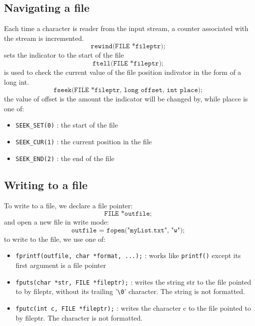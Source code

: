 \documentclass[a4paper, 10pt]{article}
\begin{document}
\subsection{Navigating a file}
Each time a character is reader from the input stream, a counter associated with the stream is incremented.
$$\texttt{rewind(FILE *fileptr);}$$
sets the indicator to the start of the file
$$\texttt{ftell(FILE *fileptr);}$$
is used to check the current value of the file position indivator in the form of a long int.
$$\texttt{fseek(FILE *fileptr, long offset, int place);}$$
the value of offset is the amount the indicator will be changed by, while placce is one of:
\begin{itemize}
    \item \texttt{SEEK\_SET(0)} : the start of the file
    \item \texttt{SEEK\_CUR(1)} : the current position in the file
    \item \texttt{SEEK\_END(2)} : the end of the file
\end{itemize}
\subsection{Writing to a file}
To write to a file, we declare a file pointer:
$$\texttt{FILE *outfile;}$$
and open a new file in write mode:
$$\texttt{outfile = fopen("myList.txt", "w");}$$
to write to the file, we use one of:
\begin{itemize}
    \item \texttt{fprintf(outfile, char *format, ...);} : works like \texttt{printf()} except its first argument is a file pointer
    \item \texttt{fputs(char *str, FILE *fileptr);} : writes the string str to the file pointed to by fileptr, without its trailing '\texttt{\textbackslash 0}' character. The string is not formatted.
    \item \texttt{fputc(int c, FILE *fileptr);} : writes the character c to the file pointed to by fileptr. The character is not formatted.
\end{itemize}
\pagebreak
\end{document}
